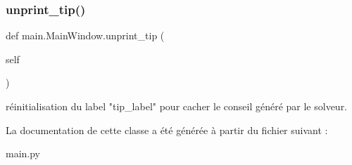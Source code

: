 \subsubsection{\texorpdfstring{unprint\+\_\+tip()}{unprint\_tip()}}
{\footnotesize\ttfamily def main.\+Main\+Window.\+unprint\+\_\+tip (\begin{DoxyParamCaption}\item[{}]{self }\end{DoxyParamCaption})}

\begin{DoxyVerb}réinitialisation du label "tip_label" pour cacher le conseil généré par le solveur. \end{DoxyVerb}
 

La documentation de cette classe a été générée à partir du fichier suivant \+:\begin{DoxyCompactItemize}
\item 
main.\+py\end{DoxyCompactItemize}
